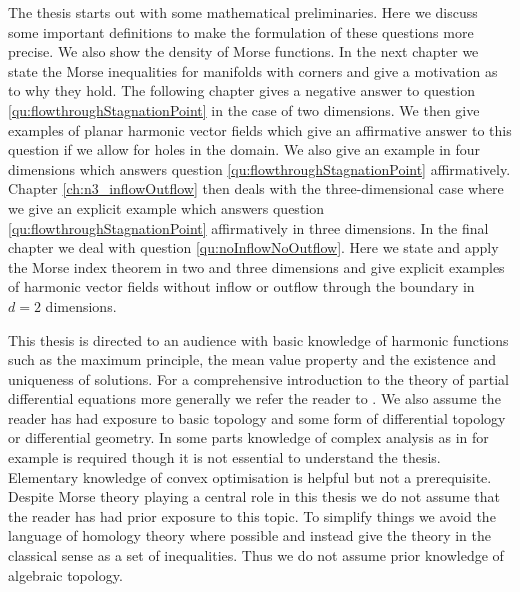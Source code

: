 The thesis starts out with some mathematical preliminaries.
Here we discuss some important definitions to make the formulation of these
questions more precise.
We also show the density of Morse functions.
In the next chapter we state the Morse inequalities for manifolds with corners and give a motivation as to why they hold.
The following chapter gives a negative answer to question \ref{qu:flowthroughStagnationPoint} in the case of two dimensions.
We then give examples of planar
harmonic vector fields which give an affirmative answer to this question if we allow for holes in the domain. We also give an example in four dimensions which answers question \ref{qu:flowthroughStagnationPoint} affirmatively.
Chapter \ref{ch:n3_inflowOutflow} then deals with the three-dimensional case where we give an explicit example which answers question \ref{qu:flowthroughStagnationPoint}
affirmatively in three dimensions.
In the final chapter we deal with question \ref{qu:noInflowNoOutflow}.
Here we state and apply the Morse index theorem in two and three dimensions and give explicit examples of harmonic vector fields without inflow or outflow through the boundary in $d=2$ dimensions.

This thesis is directed to an audience with basic knowledge of harmonic functions such
as the maximum principle, the mean value property and the existence and uniqueness of solutions.
For a comprehensive introduction to the
theory of partial differential equations more generally we refer the reader to \cite{Evans2010}.
We also assume the reader has had exposure to basic topology and some form of differential topology or
differential geometry. 
In some parts knowledge of complex analysis as in for example \cite{Gamelin2001} is required though it is not 
essential to understand the thesis.
Elementary knowledge of convex optimisation is helpful but not a prerequisite.
Despite Morse theory playing a central role in this thesis we do not assume that the reader has had
prior exposure to this topic. To simplify things we avoid the language of homology
theory where possible and instead give the theory in the classical sense as a set of inequalities.
Thus we do not assume prior knowledge of algebraic topology.

